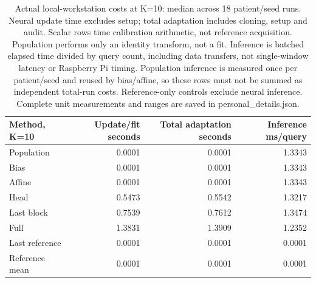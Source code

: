 \documentclass[11pt]{article}
\begin{document}
\begin{table}[!htbp]\centering\small
\begin{tabular}{lrrr}\toprule
Method, K=10 & Update/fit seconds & Total adaptation seconds & Inference ms/query\\\midrule
Population & 0.0001 & 0.0001 & 1.3343\\
Bias & 0.0001 & 0.0001 & 1.3343\\
Affine & 0.0001 & 0.0001 & 1.3343\\
Head & 0.5473 & 0.5542 & 1.3217\\
Last block & 0.7539 & 0.7612 & 1.3474\\
Full & 1.3831 & 1.3909 & 1.2352\\
Last reference & 0.0001 & 0.0001 & 0.0001\\
Reference mean & 0.0001 & 0.0001 & 0.0001\\
\bottomrule\end{tabular}
\caption{Actual local-workstation costs at K=10: median across 18 patient/seed runs. Neural update time excludes setup; total adaptation includes cloning, setup and audit. Scalar rows time calibration arithmetic, not reference acquisition. Population performs only an identity transform, not a fit. Inference is batched elapsed time divided by query count, including data transfers, not single-window latency or Raspberry Pi timing. Population inference is measured once per patient/seed and reused by bias/affine, so these rows must not be summed as independent total-run costs. Reference-only controls exclude neural inference. Complete unit measurements and ranges are saved in personal\_details.json.}\end{table}
\end{document}
